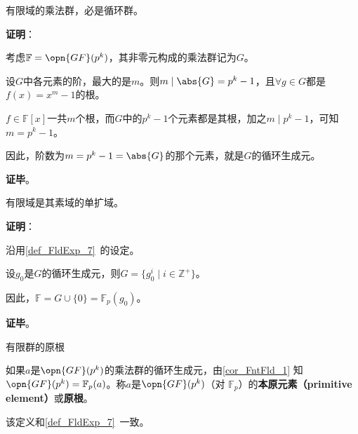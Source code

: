 \begin{theorem}{}\label{the_FntFld_1}
有限域的乘法群，必是循环群。
\end{theorem}

\textbf{证明}：

考虑$\mathbb{F}=\opn{GF}(p^k)$，其非零元构成的乘法群记为$G$。

设$G$中各元素的阶，最大的是$m$。则$m\mid \abs{G} = p^k-1$，且$\forall g\in G$都是$f(x)=x^m-1$的根。

$f\in\mathbb{F}[x]$一共$m$个根，而$G$中的$p^k-1$个元素都是其根，加之$m\mid p^k-1$，可知$m=p^k-1$。

因此，阶数为$m=p^k-1=\abs{G}$的那个元素，就是$G$的循环生成元。

\textbf{证毕}。

\begin{corollary}{}\label{cor_FntFld_1}
有限域是其素域的单扩域。
\end{corollary}

\textbf{证明}：

沿用\autoref{def_FldExp_7}~的设定。

设$g_0$是$G$的循环生成元，则$G=\{g_0^i\mid i\in\mathbb{Z}^+\}$。

因此，$\mathbb{F}=G\cup\{0\}=\mathbb{F}_p(g_0)$。

\textbf{证毕}。

\begin{definition}{有限群的原根}

如果$a$是$\opn{GF}(p^k)$的乘法群的循环生成元，由\autoref{cor_FntFld_1} 知$\opn{GF}(p^k)=\mathbb{F}_p(a)$。称$a$是$\opn{GF}(p^k)$（对 $\mathbb{F}_p$）的\textbf{本原元素（primitive element）}或\textbf{原根}。

该定义和\autoref{def_FldExp_7}~一致。

\end{definition}

